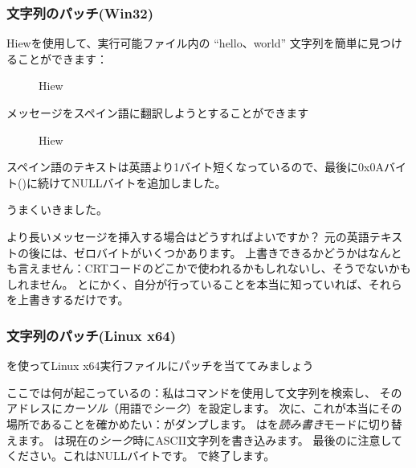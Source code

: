 \subsubsection{文字列のパッチ(Win32)}

Hiewを使用して、実行可能ファイル内の ``hello、world'' 文字列を簡単に見つけることができます：

\begin{figure}[H]
\centering
{}
\caption{Hiew}
\label{}
\end{figure}

メッセージをスペイン語に翻訳しようとすることができます

\begin{figure}[H]
\centering
{}
\caption{Hiew}
\label{}
\end{figure}

スペイン語のテキストは英語より1バイト短くなっているので、最後に0x0Aバイト()に続けてNULLバイトを追加しました。

うまくいきました。

より長いメッセージを挿入する場合はどうすればよいですか？
元の英語テキストの後には、ゼロバイトがいくつかあります。 上書きできるかどうかはなんとも言えません：\ac{CRT}コードのどこかで使われるかもしれないし、そうでないかもしれません。 
とにかく、自分が行っていることを本当に知っていれば、それらを上書きするだけです。

\subsubsection{文字列のパッチ(Linux x64)}

\myindex{\radare}
\radare{}を使ってLinux x64実行ファイルにパッチを当ててみましょう



ここでは何が起こっているの：私は\TT{/}コマンドを使用して文字列を検索し、
そのアドレスに\emph{カーソル}（\radare{}用語で\emph{シーク}）を設定します。 
次に、これが本当にその場所であることを確かめたい：がダンプします。
は\radare{}を\emph{読み書き}モードに切り替えます。 
は現在の\emph{シーク}時にASCII文字列を書き込みます。
最後のに注意してください。これはNULLバイトです。
で終了します。

%

